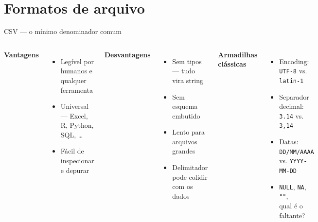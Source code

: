 \documentclass[xcolor=dvipsnames,t,aspectratio=169]{beamer}
\begin{document}
\section{Formatos de arquivo}

\begin{frame}[c]{CSV — o mínimo denominador comum}

\begin{columns}
\textbf{\color{nes_dark_purple}Vantagens}
\begin{itemize}
    \item Legível por humanos e qualquer ferramenta
    \item Universal — Excel, R, Python, SQL, \ldots
    \item Fácil de inspecionar e depurar
\end{itemize}

\vspace{0.5em}
\textbf{\color{nes_dark_purple}Desvantagens}
\begin{itemize}
    \item Sem tipos — tudo vira string
    \item Sem esquema embutido
    \item Lento para arquivos grandes
    \item Delimitador pode colidir com os dados
\end{itemize}

\textbf{\color{nes_dark_purple}Armadilhas clássicas}
\begin{itemize}
    \item Encoding: \texttt{UTF-8} vs. \texttt{latin-1}
    \item Separador decimal: \texttt{3.14} vs. \texttt{3,14}
    \item Datas: \texttt{DD/MM/AAAA} vs. \texttt{YYYY-MM-DD}
    \item \texttt{NULL}, \texttt{NA}, \texttt{""}, \texttt{-} — qual é o faltante?
\end{itemize}
\end{columns}


\end{frame}
\end{document}
